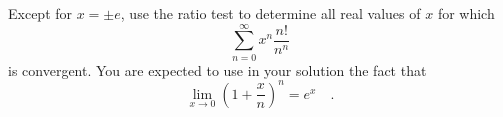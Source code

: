Except for $x=\pm e$, use the ratio test to determine all real values of $x$ for which 
\[
\sum_{n=0}^{\infty}x^n\frac{n!}{n^n}
\]
is convergent. You are expected to use in your solution the fact that 
\[
\lim_{x\to 0}\left(1+\frac{x}{n}\right)^n=e^x\quad .
\]